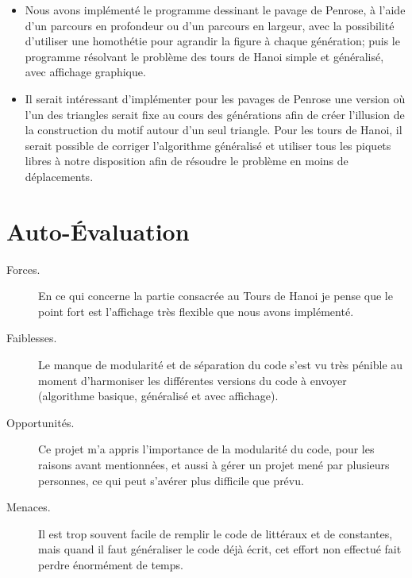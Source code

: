 \documentclass[a4paper, 11pt]{article}%
\begin{document}
	\begin{itemize}
		\item Nous avons implémenté le programme dessinant le pavage de
		Penrose, à l'aide d'un parcours en profondeur ou d'un parcours
		en largeur, avec la possibilité d'utiliser une homothétie pour
		agrandir la figure à chaque génération; puis le programme résolvant
		le problème des tours de Hanoi simple et généralisé, avec affichage
		graphique.
		\item Il serait intéressant d'implémenter pour les pavages de Penrose
		une version où l'un des triangles serait fixe au cours des générations
		afin de créer l'illusion de la construction du motif autour d'un
		seul triangle.
		Pour les tours de Hanoi, il serait possible de corriger l'algorithme
		généralisé et utiliser tous les piquets libres à notre disposition
		afin de résoudre le problème en moins de déplacements.
	\end{itemize}

\appendix

\section*{Auto-Évaluation}

	\begin{description}
		\item[Forces.] En ce qui concerne la partie consacrée au Tours de Hanoi
		je pense que le point fort est l'affichage très flexible que nous avons
		implémenté.
		\item[Faiblesses.]  Le manque de modularité et de séparation du code
		s'est vu très pénible au moment d'harmoniser les différentes versions
		du code à envoyer (algorithme basique, généralisé et avec affichage).
		\item[Opportunités.] Ce projet m'a appris l'importance de la modularité
		du code, pour les raisons avant mentionnées, et aussi à gérer un projet
		mené par plusieurs personnes, ce qui peut s'avérer plus difficile que
		prévu.
		\item[Menaces.] Il est trop souvent facile de remplir le code de
		littéraux et de constantes, mais quand il faut généraliser le
		code déjà écrit, cet effort non effectué fait perdre énormément de temps.
	\end{description}
	
\end{document}
